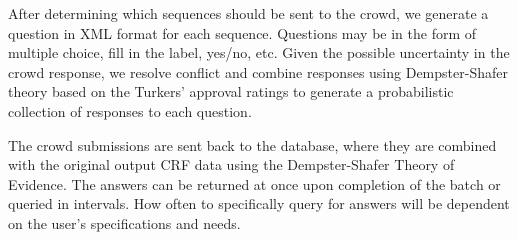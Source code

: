 After determining which sequences should be sent to the crowd, we generate a question in XML format for each sequence.  Questions may be in the form of multiple choice, fill in the label, yes/no, etc.  Given the possible uncertainty in the crowd response, we resolve conflict and combine responses using Dempster-Shafer theory based on the Turkers' approval ratings to generate a probabilistic collection of responses to each question.

The crowd submissions are sent back to the database, where they are combined with the original output CRF data using the Dempster-Shafer Theory of Evidence.  The answers can be returned at once upon completion of the batch or queried in intervals.  How often to specifically query for answers will be dependent on the user's specifications and needs. 

